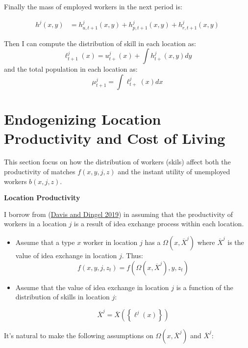 \documentclass[
  letterpaper,
  DIV=11,
  numbers=noendperiod]{scrreprt}
\begin{document}
Finally the mass of employed workers in the next period is:

\begin{align}
h^j(x,y) &=  h^j_{u, t+1}(x,y) + h^j_{p, t+1}(x,y) + h^j_{r,t+1}(x,y) 
\end{align}

Then I can compute the distribution of skill in each location as:
\[\ell^j_{t+1}(x) = u^j_{t+}(x) + \int h^j_{t+}(x,y)dy\] and the total
population in each location as: \[\mu^j_{t+1} = \int \ell^j_{t+}(x)dx\]


\hypertarget{endogenizing-location-productivity-and-cost-of-living}{%
\chapter{Endogenizing Location Productivity and Cost of
Living}\label{endogenizing-location-productivity-and-cost-of-living}}

This section focus on how the distribution of workers (skils) affect
both the productivity of matches \(f(x,y,j,z)\) and the instant utility
of unemployed workers \(b(x,j,z)\).

\textbf{Location Productivity}

I borrow from
(\protect\hyperlink{ref-davisSpatialKnowledgeEconomy2019}{Davis and
Dingel 2019}) in assuming that the productivity of workers in a location
\(j\) is a result of idea exchange process within each location.

\begin{itemize}
\item
  Assume that a type \(x\) worker in location \(j\) has a
  \(\Omega(x, \overline{X}^j)\) where \(\overline{X}^j\) is the value of
  idea exchange in location \(j\). Thus:
  \[f(x,y,j,z_t) = f\left(\Omega(x, \overline{X}^j), y, z_t\right)\]
\item
  Assume that the value of idea exchange in location \(j\) is a function
  of the distribution of skills in location \(j\):

  \[ \overline{X}^j = \overline{X}\left(\left\{\ell^j(x)\right\}\right) \]
\end{itemize}

It's natural to make the following assumptions on
\(\Omega(x, \overline{X}^j)\) and \(\overline{X}^j\):
\end{document}
